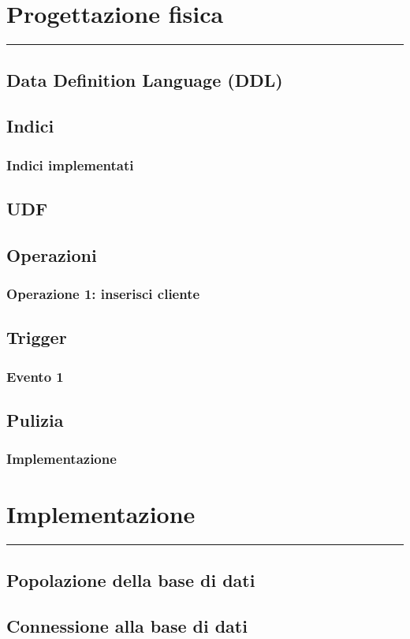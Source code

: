 \documentclass[legalpaper]{article}
\begin{document}
\newpage
\section{Progettazione fisica}
\rule{\linewidth}{1.5pt}
\subsection{Data Definition Language (DDL)}
\subsection{Indici}
\subsubsection{Indici implementati}
\subsection{UDF}
\subsection{Operazioni}
\subsubsection{Operazione 1: inserisci cliente}
\subsection{Trigger}
\subsubsection{Evento 1}
\subsection{Pulizia}
\subsubsection{Implementazione}
\newpage

\section{Implementazione}
\rule{\linewidth}{1.5pt}
\subsection{Popolazione della base di dati}
\subsection{Connessione alla base di dati}
\end{document}
